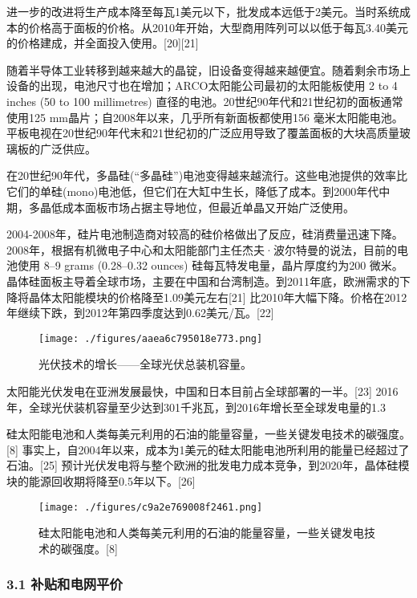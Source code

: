 进一步的改进将生产成本降至每瓦1美元以下，批发成本远低于2美元。当时系统成本的价格高于面板的价格。从2010年开始，大型商用阵列可以以低于每瓦3.40美元的价格建成，并全面投入使用。[20][21]

随着半导体工业转移到越来越大的晶锭，旧设备变得越来越便宜。随着剩余市场上设备的出现，电池尺寸也在增加；ARCO太阳能公司最初的太阳能板使用 2 to 4 inches (50 to 100 millimetres) 直径的电池。20世纪90年代和21世纪初的面板通常使用125 mm晶片；自2008年以来，几乎所有新面板都使用156 毫米太阳能电池。平板电视在20世纪90年代末和21世纪初的广泛应用导致了覆盖面板的大块高质量玻璃板的广泛供应。

在20世纪90年代，多晶硅(“多晶硅”)电池变得越来越流行。这些电池提供的效率比它们的单硅(mono)电池低，但它们在大缸中生长，降低了成本。到2000年代中期，多晶低成本面板市场占据主导地位，但最近单晶又开始广泛使用。

2004-2008年，硅片电池制造商对较高的硅价格做出了反应，硅消费量迅速下降。2008年，根据有机微电子中心和太阳能部门主任杰夫·波尔特曼的说法，目前的电池使用 8–9 grams (0.28–0.32 ounces) 硅每瓦特发电量，晶片厚度约为200 微米。 晶体硅面板主导着全球市场，主要在中国和台湾制造。到2011年底，欧洲需求的下降将晶体太阳能模块的价格降至1.09美元左右[21] 比2010年大幅下降。价格在2012年继续下跌，到2012年第四季度达到0.62美元/瓦。[22]

\begin{figure}[ht]
\centering
\texttt{[image: ./figures/aaea6c795018e773.png]}
\caption{光伏技术的增长——全球光伏总装机容量。} \label{fig_TYNDC_14}
\end{figure}

太阳能光伏发电在亚洲发展最快，中国和日本目前占全球部署的一半。[23] 2016年，全球光伏装机容量至少达到301千兆瓦，到2016年增长至全球发电量的1.3%

硅太阳能电池和人类每美元利用的石油的能量容量，一些关键发电技术的碳强度。[8]
事实上，自2004年以来，成本为1美元的硅太阳能电池所利用的能量已经超过了石油。[25] 预计光伏发电将与整个欧洲的批发电力成本竞争，到2020年，晶体硅模块的能源回收期将降至0.5年以下。[26]

\begin{figure}[ht]
\centering
\texttt{[image: ./figures/c9a2e769008f2461.png]}
\caption{硅太阳能电池和人类每美元利用的石油的能量容量，一些关键发电技术的碳强度。[8]} \label{fig_TYNDC_15}
\end{figure}


\subsubsection{3.1 补贴和电网平价}

